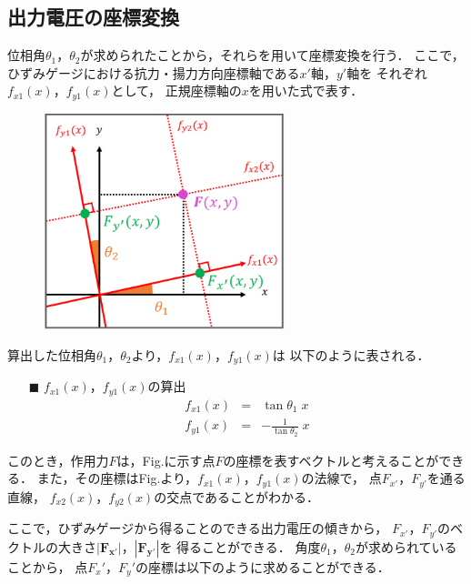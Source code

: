 \documentclass[twocolumn,a4j]{jsarticle}
\begin{document}
\subsection{出力電圧の座標変換}
位相角$\theta_1$，$\theta_2$が求められたことから，それらを用いて座標変換を行う．
ここで，ひずみゲージにおける抗力・揚力方向座標軸である$x'$軸，$y'$軸を
それぞれ$f_{x1}\left(x\right)$，$f_{y1}\left(x\right)$として，
正規座標軸の$x$を用いた式で表す．

\begin{figure}[htbp]
    \footnotesize
    \begin{center}
        \includegraphics[width=70mm]{../images/image_3.png}
        \caption{}
    \end{center}
\end{figure}

算出した位相角$\theta_1$，$\theta_2$より，$f_{x1}\left(x\right)$，$f_{y1}\left(x\right)$は
以下のように表される．

\begin{itemize}
    \item [$\blacksquare$] $f_{x1}\left(x\right)$，$f_{y1}\left(x\right)$の算出
          \begin{eqnarray*}
              f_{x1}\left(x\right) &=& \tan \theta_1 \; x\\
              f_{y1}\left(x\right) &=& - \frac{1}{\tan \theta_2}\; x
          \end{eqnarray*}
\end{itemize}

このとき，作用力$F$は，Fig.に示す点$F$の座標を表すベクトルと考えることができる．
また，その座標はFig.より，$f_{x1}\left(x\right)$，$f_{y1}\left(x\right)$の法線で，
点$F_{x'}$，$F_{y'}$を通る直線，
$f_{x2}\left(x\right)$，$f_{y2}\left(x\right)$の交点であることがわかる．\par
ここで，ひずみゲージから得ることのできる出力電圧の傾きから，
$F_{x'}$，$F_{y'}$のベクトルの大きさ$|\boldsymbol{F_{x'}}|$，$|\boldsymbol{F_{y'}}|$を
得ることができる．
角度$\theta_1$，$\theta_2$が求められていることから，
点$F_x'$，$F_y'$の座標は以下のように求めることができる．
\end{document}
